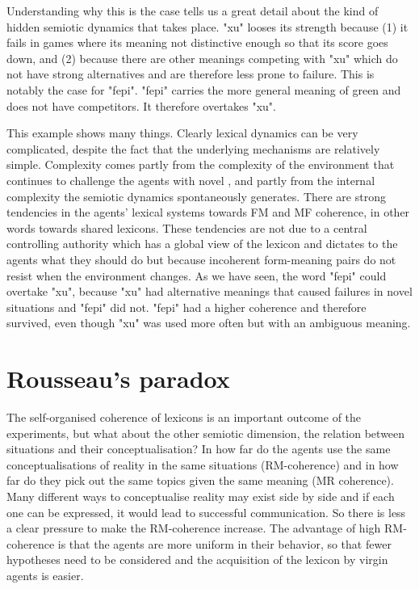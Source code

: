 Understanding why this is the case
tells us a great detail about the kind 
of hidden semiotic dynamics that takes place. "xu" looses its
strength because (1) it fails in games where its meaning
not distinctive enough so that its score goes
down, and (2) because there 
are other meanings competing with "xu" which do not 
have strong alternatives and are therefore
less prone to failure. This is notably the case for
"fepi". "fepi" carries the more general meaning of green
and does not have competitors. It therefore overtakes
"xu". 

This example shows many things. Clearly
lexical dynamics can be very complicated, despite the 
fact that the underlying mechanisms are relatively 
simple. Complexity comes partly from the complexity of
the environment that continues to challenge the agents
with novel , and partly from the internal 
complexity the semiotic dynamics spontaneously generates. 
There are strong tendencies in the agents' lexical systems
towards FM and MF coherence, 
in other words towards shared lexicons. These tendencies
are not due to a central controlling authority which 
has a global view of the lexicon and dictates to the 
agents what they should do but because incoherent 
form-meaning pairs do not resist when the environment 
changes. As we have seen, the word "fepi" could 
overtake "xu", because "xu" had alternative meanings that 
caused failures in novel situations and "fepi" did not. 
"fepi" had a higher coherence and therefore survived, even
though "xu" was used more often but with an 
ambiguous meaning. 

\section{Rousseau's paradox}

The self-organised coherence of lexicons is an important
outcome of the experiments, but what about the other
semiotic dimension, the relation
between situations and their conceptualisation? 
In how far do the agents use the same 
conceptualisations of reality in the same situations
(RM-coherence) and in how far do they pick out the same topics
given the same meaning (MR coherence). Many different ways
to conceptualise reality may exist side by side and if
each one can be expressed, it would lead to successful
communication. So there is 
less a clear pressure to make the RM-coherence increase. 
The advantage of high RM-coherence is that the agents 
are more uniform in their behavior, so that fewer 
hypotheses need to be considered and the acquisition of 
the lexicon by virgin agents is easier. 

